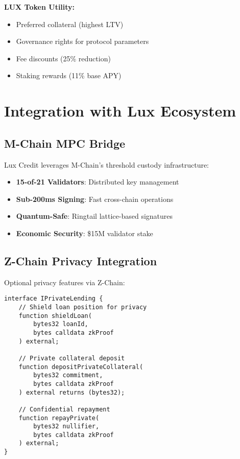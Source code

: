 \documentclass[11pt,a4paper]{article}
\begin{document}
\textbf{LUX Token Utility:}
\begin{itemize}
\item Preferred collateral (highest LTV)
\item Governance rights for protocol parameters
\item Fee discounts (25\% reduction)
\item Staking rewards (11\% base APY)
\end{itemize}

\section{Integration with Lux Ecosystem}

\subsection{M-Chain MPC Bridge}

Lux Credit leverages M-Chain's threshold custody infrastructure:

\begin{itemize}
\item \textbf{15-of-21 Validators}: Distributed key management
\item \textbf{Sub-200ms Signing}: Fast cross-chain operations
\item \textbf{Quantum-Safe}: Ringtail lattice-based signatures
\item \textbf{Economic Security}: \$15M validator stake
\end{itemize}

\subsection{Z-Chain Privacy Integration}

Optional privacy features via Z-Chain:

\begin{lstlisting}[language=Solidity, basicstyle=\small\ttfamily]
interface IPrivateLending {
    // Shield loan position for privacy
    function shieldLoan(
        bytes32 loanId,
        bytes calldata zkProof
    ) external;
    
    // Private collateral deposit
    function depositPrivateCollateral(
        bytes32 commitment,
        bytes calldata zkProof
    ) external returns (bytes32);
    
    // Confidential repayment
    function repayPrivate(
        bytes32 nullifier,
        bytes calldata zkProof
    ) external;
}
\end{lstlisting}
\end{document}

